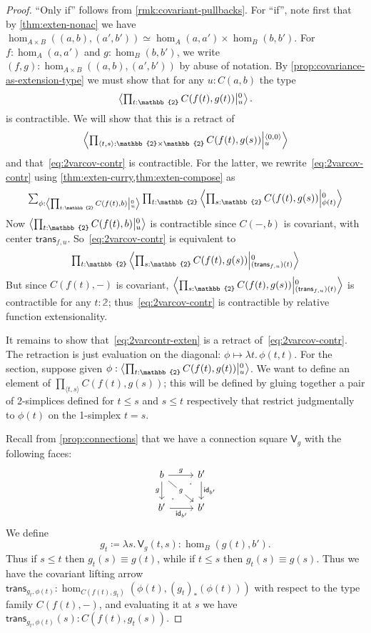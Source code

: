 \documentclass[12pt]{amsart}
\theoremstyle{plain}
\theoremstyle{definition}
\theoremstyle{remark}
\numberwithin{equation}{section}
\newcommand{\tprod}{\textstyle\prod}
\newcommand{\tsum}{\textstyle\sum}
\newcommand{\exten}[4]{\left\langle\mathchoice{\textstyle\prod_{#1}}{\textstyle\prod_{#1}}{\scriptstyle\prod_{#1}}{\scriptscriptstyle\prod_{#1}} #2 \middle|^{#3}_{#4}\right\rangle}
\newcommand{\jdeq}{\equiv}
\newcommand{\defeq}{\coloneqq}
\newcommand{\pair}[1]{\langle #1\rangle}
\newcommand{\connmax}[1]{\mathsf{V}_{#1}}
\newcommand{\lam}[1]{\lambda #1.\,}
\newcommand{\two}{\mathbb{2}}
\newcommand{\idarr}[1]{\mathsf{id}_{#1}}
\newcommand{\covtr}[1]{{#1}_*}  %
\newcommand{\istrans}[2]{\mathsf{trans}_{#1,#2}}
\begin{document}
\begin{proof}
  ``Only if'' follows from \cref{rmk:covariant-pullbacks}.
  For ``if'', note first that by \cref{thm:exten-nonac} we have $\hom_{A\times B}((a,b),(a',b'))\simeq \hom_A(a,a')\times \hom_B(b,b')$. For  $f:\hom_A(a,a')$ and $g:\hom_B(b,b')$, we write $(f,g):\hom_{A\times B}((a,b),(a',b'))$ by abuse of notation.
{ By \cref{prop:covariance-as-extension-type} we must show that for any $u:C(a,b)$ the type
 \begin{equation}
    \exten{t:\two}{C(f(t),g(t))}{0}{u}.\label{eq:2varcontr-exten}
  \end{equation}
  is contractible.}
  We will show that this is a retract of
  \begin{equation}
    \exten{\pair{t,s}:\two\times\two}{C(f(t),g(s))}{\pair{0,0}}{u}\label{eq:2varcov-contr}
  \end{equation}
  and that~\eqref{eq:2varcov-contr} is contractible.
  For the latter, we rewrite~\eqref{eq:2varcov-contr} using \cref{thm:exten-curry,thm:exten-compose} as
  \[ \tsum_{\phi:\exten{t:\two}{C(f(t),b)}{0}{u}} \tprod_{t:\two} \exten{s:\two}{C(f(t),g(s))}{0}{\phi(t)} \]
  Now ${\exten{t:\two}{C(f(t),b)}{0}{u}}$ is contractible since $C(-,b)$ is covariant, with center $\istrans f u$.
  So~\eqref{eq:2varcov-contr} is equivalent to
  \[ \tprod_{t:\two} \exten{s:\two}{C(f(t),g(s))}{0}{(\istrans f u)(t)} \]
  But since $C(f(t),-)$ is covariant, $\exten{s:\two}{C(f(t),g(s))}{0}{(\istrans f u)(t)}$ is contractible for any $t:\two$; thus~\eqref{eq:2varcov-contr} is contractible by relative function extensionality.

  It remains to show that~\eqref{eq:2varcontr-exten} is a retract of~\eqref{eq:2varcov-contr}.
  The retraction is just evaluation on the diagonal: $\phi \mapsto \lam{t} \phi(t,t)$.
  For the section, suppose given $\phi:\exten{t:\two}{C(f(t),g(t))}{0}{u}$.  We want to define an element of $\prod_{\pair{t,s}} C(f(t),g(s))$; this will be defined by gluing together a pair of 2-simplices defined for $t \le s$ and $s \le t$ respectively that restrict judgmentally to  $\phi(t)$ on the 1-simplex $t = s$.

  Recall from \cref{prop:connections} that we have a connection square $\connmax g$ with the following faces:
  \[
  \begin{tikzcd}
    b \arrow[r, "g"] \arrow[dr, "g" description] \arrow[d, "g"'] & b' \arrow[d, "\idarr{b'}"] \\ b' \arrow[r, "\idarr{b'}"']  \arrow[ur, phantom, "\cdot" very near start, "\cdot" very near end] & b'
  \end{tikzcd}
  \]
  We define
  \[ g_t \defeq \lam{s} \connmax g(t,s) : \hom_B(g(t),b'). \]
  Thus if $s\le t$ then $g_t(s)\jdeq g(t)$, while if $t\le s$ then $g_t(s)\jdeq g(s)$.
  Thus we have the covariant lifting arrow $\istrans{g_t}{\phi(t)} : \hom_{C(f(t),g_t)}(\phi(t),\covtr{(g_t)}{(\phi(t))})$ with respect to the type family $C(f(t),-)$, and evaluating it at $s$ we have $\istrans{g_t}{\phi(t)}(s): C(f(t),g_t(s))$.


\end{proof}
\end{document}
